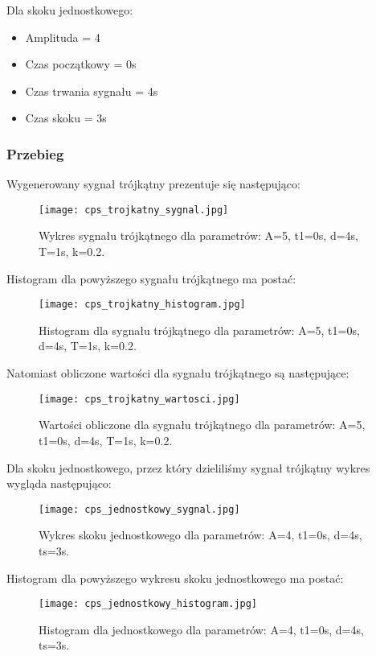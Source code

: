 \documentclass[12pt]{article}
\begin{document}
Dla skoku jednostkowego:
\begin{itemize}
    \item Amplituda = 4
    \item Czas początkowy = 0s
    \item Czas trwania sygnału = 4s
    \item Czas skoku = 3s
\end{itemize}


\subsubsection{Przebieg}
Wygenerowany sygnał trójkątny prezentuje się następująco:
\begin{figure}[H]
    \centering
    \texttt{[image: cps\_trojkatny\_sygnal.jpg]}
    \caption{Wykres sygnału trójkątnego dla parametrów:  A=5, t1=0s, d=4s, T=1s, k=0.2.}
    \label{Wykres dla sygnału trójkątnego}
\end{figure}

Histogram dla powyższego sygnału trójkątnego ma postać:
\begin{figure}[H]
    \centering
    \texttt{[image: cps\_trojkatny\_histogram.jpg]}
    \caption{Histogram dla sygnału trójkątnego dla parametrów:  A=5, t1=0s, d=4s, T=1s, k=0.2.}
    \label{histogram dla sygnału trójkątnego}
\end{figure}

Natomiast obliczone wartości dla sygnału trójkątnego są następujące:
\begin{figure}[H]
    \centering
    \texttt{[image: cps\_trojkatny\_wartosci.jpg]}
    \caption{Wartości obliczone dla sygnału trójkątnego dla parametrów:  A=5, t1=0s, d=4s, T=1s, k=0.2.}
    \label{Wartości dla sygnalu trójkątnego}
\end{figure}


Dla skoku jednostkowego, przez który dzieliliśmy sygnał trójkątny wykres wygląda następująco:
\begin{figure}[H]
    \centering
    \texttt{[image: cps\_jednostkowy\_sygnal.jpg]}
    \caption{Wykres skoku jednostkowego dla parametrów:  A=4, t1=0s, d=4s, ts=3s.}
    \label{wykres dla skoku jednostkowego}
\end{figure}

Histogram dla powyższego wykresu skoku jednostkowego ma postać:
\begin{figure}[H]
    \centering
    \texttt{[image: cps\_jednostkowy\_histogram.jpg]}
    \caption{Histogram dla jednostkowego dla parametrów:  A=4, t1=0s, d=4s, ts=3s.}
    \label{histogram dla skoku jednostkowego}
\end{figure}
\end{document}

